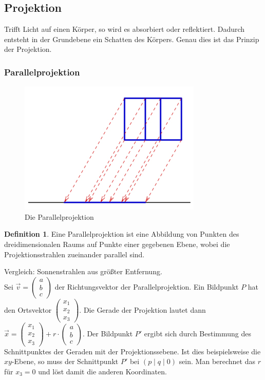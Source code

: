 \documentclass[a4paper,10pt,DIV9, BCOR12mm, oneside,openright,openbib]{scrreprt}
\theoremstyle{definition}
\newtheorem{mydef}{Definition}[section]
\theoremstyle{plain}
\begin{document}
\subsection{Projektion}
Trifft Licht auf einen Körper, so wird es absorbiert oder reflektiert. Dadurch entsteht in der Grundebene ein Schatten des Körpers. Genau dies ist das Prinzip der Projektion.
\subsubsection{Parallelprojektion}
\begin{figure}[h!]
 \centering
 \includegraphics[scale=0.5,keepaspectratio=true]{./Bilder/parallelproj.jpg}
 \caption{Die Parallelprojektion}
 \label{fig:parallelproj}
\end{figure}

\begin{mydef}
Eine Parallelprojektion ist eine Abbildung von Punkten des dreidimensionalen Raums auf Punkte einer gegebenen Ebene, wobei die Projektionsstrahlen zueinander parallel sind.
\end{mydef}
Vergleich: Sonnenstrahlen aus größter Entfernung.\\
Sei $\vec{v} = \begin{pmatrix} a \\ b \\ c \end{pmatrix}$ der Richtungsvektor der Parallelprojektion. Ein Bildpunkt $P$ hat den Ortsvektor $\begin{pmatrix} x_1 \\ x_2 \\ x_3 \end{pmatrix}$. Die Gerade der Projektion lautet dann $\vec{x} = \begin{pmatrix} x_1 \\ x_2 \\ x_3 \end{pmatrix} + r \cdot \begin{pmatrix} a \\ b \\ c \end{pmatrix}$. Der Bildpunkt $P'$ ergibt sich durch Bestimmung des Schnittpunktes der Geraden mit der Projektionssebene. Ist dies beispielsweise die $xy$-Ebene, so muss der Schnittpunkt $P'$ bei $(p \mid q\mid 0)$ sein. Man berechnet das $r$ für $x_3 = 0$ und löst damit die anderen Koordinaten.
\end{document}
